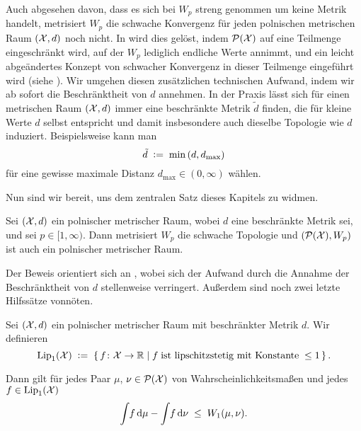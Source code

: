 \documentclass[../thesis/thesis.tex]{subfiles}
\begin{document}
	Auch abgesehen davon, dass es sich bei $W_p$ streng genommen um keine Metrik handelt, metrisiert $W_p$ die schwache Konvergenz für jeden polnischen metrischen Raum $(\mathcal{X}, d)$ noch nicht.
	In \cite{Villani.2009} wird dies gelöst, indem $\mathcal{P}(\mathcal{X})$ auf eine Teilmenge eingeschränkt wird, auf der $W_p$ lediglich endliche Werte annimmt, und ein leicht abgeändertes Konzept
	von schwacher Konvergenz in dieser Teilmenge eingeführt wird (siehe \cite[Definition 6.4 und 6.8]{Villani.2009}). Wir umgehen diesen zusätzlichen technischen Aufwand, 
	indem wir ab sofort die Beschränktheit von $d$ annehmen.
	In der Praxis lässt sich für einen metrischen Raum $(\mathcal{X}, d)$ immer eine beschränkte Metrik $\tilde{d}$ finden, die für kleine Werte $d$ selbst entspricht und damit insbesondere auch dieselbe Topologie wie $d$ induziert. Beispielsweise kann man
	\[ \tilde{d} \; \vcentcolon = \; \min \left(d, d_{\max}\right) \]
	für eine gewisse maximale Distanz $d_{\max} \in (0, \infty)$ wählen.

	Nun sind wir bereit, uns dem zentralen Satz dieses Kapitels zu widmen.

	\begin{Satz}
		\label{satz:wassersteinmetrik_schwache_konvergenz}
		Sei $(\mathcal{X}, d)$ ein polnischer metrischer Raum, wobei $d$ eine beschränkte Metrik sei, und sei $p \in [1, \infty)$. Dann metrisiert $W_p$ die schwache
		Topologie und $(\mathcal{P}(\mathcal{X}), W_p)$ ist auch ein polnischer metrischer Raum.
	\end{Satz}

	Der Beweis orientiert sich an \cite[Theorem 6.9 und Corollary 6.13]{Villani.2009}, wobei sich der Aufwand durch die Annahme der Beschränktheit von $d$ stellenweise verringert.
	Außerdem sind noch zwei letzte Hilfssätze vonnöten.
	
	\begin{Hilfssatz}
		\label{hilfssatz:dualitätsformel_von_kantorovich_rubinstein}
		Sei $(\mathcal{X}, d)$ ein polnischer metrischer Raum mit beschränkter Metrik $d$. Wir definieren
		\[ \mathrm{Lip}_1(\mathcal{X}) \; \vcentcolon = \; \left\{\, f \colon \mathcal{X} \to \mathbb{R} \; \middle| \; f \; \text{ist lipschitzstetig mit Konstante} \; \leq 1  \,\right\} \text{.} \]
		
		Dann gilt für jedes Paar $\mu$, $\nu \in \mathcal{P}(\mathcal{X})$ von Wahrscheinlichkeitsmaßen und jedes $f \in \mathrm{Lip}_1(\mathcal{X})$
		\[ \int_{} \, f \, \mathrm{d}\mu - \int_{} \, f \, \mathrm{d}\nu \; \leq \; W_1(\mu, \nu) \text{.} \]
	\end{Hilfssatz}
\end{document}
